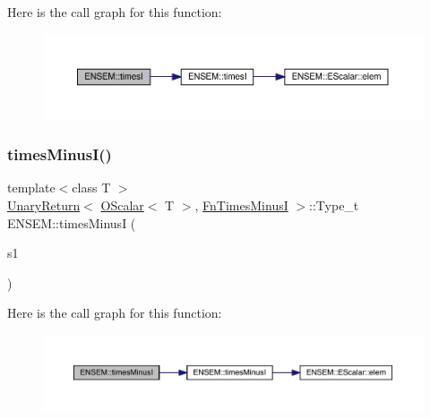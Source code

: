 Here is the call graph for this function\+:\nopagebreak
\begin{figure}[H]
\begin{center}
\leavevmode
\includegraphics[width=350pt]{d1/d71/group__obsscalar_gad7403718b5f9341f1aafa59ca287ea31_cgraph}
\end{center}
\end{figure}
\mbox{\label{group__obsscalar_ga1dc10f8daa357f1e30ce7e8bce41c52e}} 
\subsubsection{\texorpdfstring{timesMinusI()}{timesMinusI()}}
{\footnotesize\ttfamily template$<$class T $>$ \\
\mbox{\hyperlink{structENSEM_1_1UnaryReturn}{Unary\+Return}}$<$ \mbox{\hyperlink{classENSEM_1_1OScalar}{O\+Scalar}}$<$ T $>$, \mbox{\hyperlink{structENSEM_1_1FnTimesMinusI}{Fn\+Times\+MinusI}} $>$\+::Type\+\_\+t E\+N\+S\+E\+M\+::times\+MinusI (\begin{DoxyParamCaption}\item[{const \mbox{\hyperlink{classENSEM_1_1OScalar}{O\+Scalar}}$<$ T $>$ \&}]{s1 }\end{DoxyParamCaption})\hspace{0.3cm}{\ttfamily [inline]}}

Here is the call graph for this function\+:\nopagebreak
\begin{figure}[H]
\begin{center}
\leavevmode
\includegraphics[width=350pt]{d1/d71/group__obsscalar_ga1dc10f8daa357f1e30ce7e8bce41c52e_cgraph}
\end{center}
\end{figure}
\mbox{\label{group__obsscalar_ga8fa5feb767fc8b3814940792eddf13c8}} 
